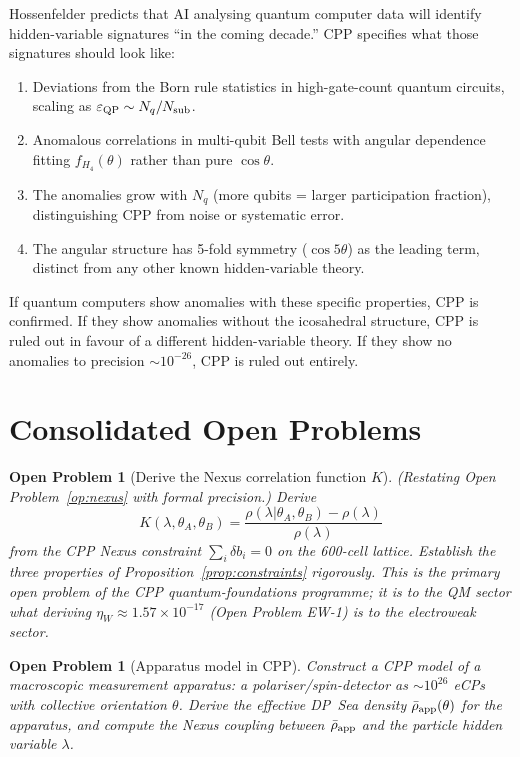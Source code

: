 \documentclass[11pt,letterpaper]{article}
\newtheorem{openprob}[theorem]{Open Problem}
\newcommand{\eps}{\varepsilon}
\begin{document}
Hossenfelder predicts that AI analysing quantum computer data will
identify hidden-variable signatures ``in the coming decade.''  CPP
specifies what those signatures should look like:

\begin{enumerate}
\item Deviations from the Born rule statistics in high-gate-count
  quantum circuits, scaling as $\eps_{\rm QP} \sim N_q / N_{\rm sub}$.
\item Anomalous correlations in multi-qubit Bell tests with angular
  dependence fitting $f_{H_4}(\theta)$ rather than pure $\cos\theta$.
\item The anomalies grow with $N_q$ (more qubits = larger participation
  fraction), distinguishing CPP from noise or systematic error.
\item The angular structure has 5-fold symmetry ($\cos 5\theta$) as
  the leading term, distinct from any other known hidden-variable theory.
\end{enumerate}

If quantum computers show anomalies with these specific properties,
CPP is confirmed.  If they show anomalies without the icosahedral
structure, CPP is ruled out in favour of a different hidden-variable
theory.  If they show no anomalies to precision $\sim 10^{-26}$, CPP
is ruled out entirely.

\section{Consolidated Open Problems}

\begin{openprob}[Derive the Nexus correlation function $K$]
\label{op:K}
(Restating Open Problem~\ref{op:nexus} with formal precision.)
Derive
\[
K(\lambda, \theta_A, \theta_B) = \frac{\rho(\lambda|\theta_A,\theta_B)
- \rho(\lambda)}{\rho(\lambda)}
\]
from the CPP Nexus constraint $\sum_i \delta b_i = 0$ on the
600-cell lattice.  Establish the three properties of
Proposition~\ref{prop:constraints} rigorously.
This is the primary open problem of the CPP quantum-foundations
programme; it is to the QM sector what deriving
$\eta_W \approx 1.57\times10^{-17}$ (Open Problem EW-1) is to the
electroweak sector.
\end{openprob}

\begin{openprob}[Apparatus model in CPP]
\label{op:apparatus}
Construct a CPP model of a macroscopic measurement apparatus:
a polariser/spin-detector as $\sim10^{26}$ eCPs with collective
orientation $\theta$.  Derive the effective DP~Sea density
$\bar\rho_{\rm app}(\theta)$ for the apparatus, and compute
the Nexus coupling between $\bar\rho_{\rm app}$ and the
particle hidden variable $\lambda$.
\end{openprob}
\end{document}
